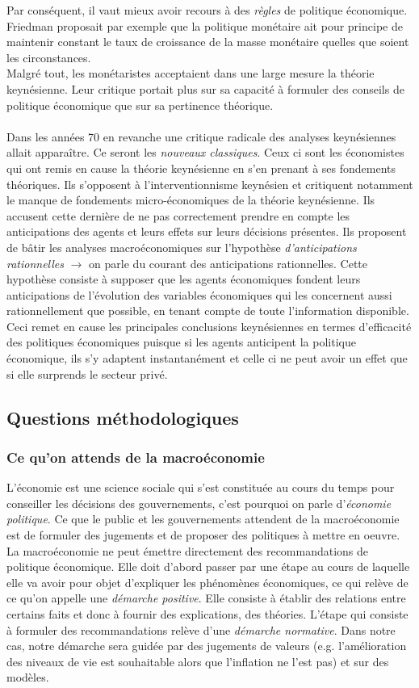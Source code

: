 \documentclass[10pt]{book}
\begin{document}
Par conséquent, il vaut mieux avoir recours à des \textit{règles} de politique économique. Friedman proposait par exemple que la politique monétaire ait pour principe de maintenir constant le taux de croissance de la masse monétaire quelles que soient les circonstances. \\
Malgré tout, les monétaristes acceptaient dans une large mesure la théorie keynésienne. Leur critique portait plus sur sa capacité à formuler des conseils de politique économique que sur sa pertinence théorique. \\ \\
Dans les années 70 en revanche une critique radicale des analyses keynésiennes allait apparaître. Ce seront les \textit{nouveaux classiques}. Ceux ci sont les économistes qui ont remis en cause la théorie keynésienne en s'en prenant à ses fondements théoriques. Ils s'opposent à l'interventionnisme keynésien et critiquent notamment le manque de fondements micro-économiques de la théorie keynésienne. Ils accusent cette dernière de ne pas correctement prendre en compte les anticipations des agents et leurs effets sur leurs décisions présentes. Ils proposent de bâtir les analyses macroéconomiques sur l'hypothèse \textit{d'anticipations rationnelles} $\rightarrow$ on parle du courant des anticipations rationnelles. Cette hypothèse consiste à supposer que les agents économiques fondent leurs anticipations de l'évolution des variables économiques qui les concernent aussi rationnellement que possible, en tenant compte de toute l'information disponible. Ceci remet en cause les principales conclusions keynésiennes en termes d'efficacité des politiques économiques puisque si les agents anticipent la politique économique, ils s'y adaptent instantanément et celle ci ne peut avoir un effet que si elle surprends le secteur privé. \\

\subsection{Questions méthodologiques}
\subsubsection{Ce qu'on attends de la macroéconomie}
L'économie est une science sociale qui s'est constituée au cours du temps pour conseiller les décisions des gouvernements, c'est pourquoi on parle d'\textit{économie politique}. Ce que le public et les gouvernements attendent de la macroéconomie est de formuler des jugements et de proposer des politiques à mettre en oeuvre. \\
La macroéconomie ne peut émettre directement des recommandations de politique économique. Elle doit d'abord passer par une étape au cours de laquelle elle va avoir pour objet d'expliquer les phénomènes économiques, ce qui relève de ce qu'on appelle une \textit{démarche positive}. Elle consiste à établir des relations entre certains faits et donc à fournir des explications, des théories. L'étape qui consiste à formuler des recommandations relève d'une \textit{démarche normative}. Dans notre cas, notre démarche sera guidée par des jugements de valeurs (e.g. l'amélioration des niveaux de vie est souhaitable alors que l'inflation ne l'est pas) et sur des modèles.
\end{document}

